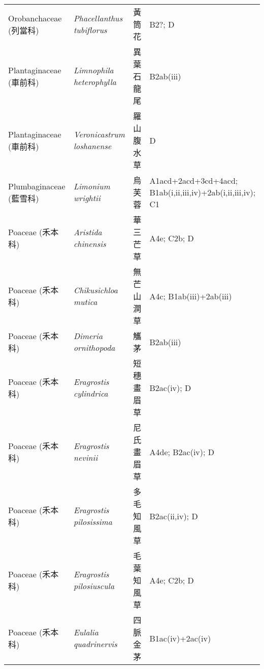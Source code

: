 \begin{longtable}{p{3cm}p{5cm}p{3cm}p{4cm}}
    Orobanchaceae (列當科) & \textit{Phacellanthus tubiflorus}  & 黃筒花 & B2?; D \index{Phacellanthus@\textit{Phacellanthus}!tubiflorus@\textit{tubiflorus}}  \index{黃筒花} \\
    Plantaginaceae (車前科) & \textit{Limnophila heterophylla}  & 異葉石龍尾 & B2ab(iii) \index{Limnophila@\textit{Limnophila}!heterophylla@\textit{heterophylla}}  \index{異葉石龍尾} \\
    Plantaginaceae (車前科) & \textit{Veronicastrum loshanense}  & 羅山腹水草 & D \index{Veronicastrum@\textit{Veronicastrum}!loshanense@\textit{loshanense}}  \index{羅山腹水草} \\
    Plumbaginaceae (藍雪科) & \textit{Limonium wrightii}  & 烏芙蓉 & A1acd+2acd+3cd+4acd; B1ab(i,ii,iii,iv)+2ab(i,ii,iii,iv); C1 \index{Limonium@\textit{Limonium}!wrightii@\textit{wrightii}}  \index{烏芙蓉} \\
    Poaceae (禾本科) & \textit{Aristida chinensis}  & 華三芒草 & A4e; C2b; D \index{Aristida@\textit{Aristida}!chinensis@\textit{chinensis}}  \index{華三芒草} \\
    Poaceae (禾本科) & \textit{Chikusichloa mutica}  & 無芒山澗草 & A4c; B1ab(iii)+2ab(iii) \index{Chikusichloa@\textit{Chikusichloa}!mutica@\textit{mutica}}  \index{無芒山澗草} \\
    Poaceae (禾本科) & \textit{Dimeria ornithopoda}  & 觿茅 & B2ab(iii) \index{Dimeria@\textit{Dimeria}!ornithopoda@\textit{ornithopoda}}  \index{觿茅} \\
    Poaceae (禾本科) & \textit{Eragrostis cylindrica}  & 短穗畫眉草 & B2ac(iv); D \index{Eragrostis@\textit{Eragrostis}!cylindrica@\textit{cylindrica}}  \index{短穗畫眉草} \\
    Poaceae (禾本科) & \textit{Eragrostis nevinii}  & 尼氏畫眉草 & A4de; B2ac(iv); D \index{Eragrostis@\textit{Eragrostis}!nevinii@\textit{nevinii}}  \index{尼氏畫眉草} \\
    Poaceae (禾本科) & \textit{Eragrostis pilosissima}  & 多毛知風草 & B2ac(ii,iv); D \index{Eragrostis@\textit{Eragrostis}!pilosissima@\textit{pilosissima}}  \index{多毛知風草} \\
    Poaceae (禾本科) & \textit{Eragrostis pilosiuscula}  & 毛葉知風草 & A4e; C2b; D \index{Eragrostis@\textit{Eragrostis}!pilosiuscula@\textit{pilosiuscula}}  \index{毛葉知風草} \\
    Poaceae (禾本科) & \textit{Eulalia quadrinervis}  & 四脈金茅 & B1ac(iv)+2ac(iv) \index{Eulalia@\textit{Eulalia}!quadrinervis@\textit{quadrinervis}}  \index{四脈金茅} \\

\end{longtable}
